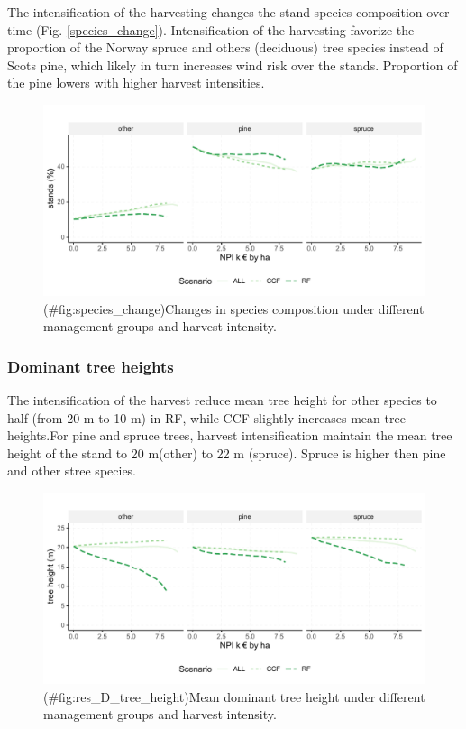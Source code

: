 \documentclass[]{elsarticle} %
\makeatletter
\def\maxwidth{\ifdim\Gin@nat@width>\linewidth\linewidth
\else\Gin@nat@width\fi}
\let\Oldincludegraphics\includegraphics
\renewcommand{\includegraphics}[1]{\Oldincludegraphics[width=\maxwidth]{#1}}
\makeatother
\begin{document}
The intensification of the harvesting changes the stand species composition over time (Fig. \ref{species_change}). Intensification of the harvesting favorize the proportion of the Norway spruce and others (deciduous) tree species instead of Scots pine, which likely in turn increases wind risk over the stands. Proportion of the pine lowers with higher harvest intensities.

\begin{figure}
\centering
\includegraphics{test_manus_files/figure-latex/species_change-1.pdf}
\caption{(\#fig:species\_change)Changes in species composition under different management groups and harvest intensity.}
\end{figure}

\hypertarget{dominant-tree-heights}{%
\subsubsection{Dominant tree heights}\label{dominant-tree-heights}}

The intensification of the harvest reduce mean tree height for other species to half (from 20 m to 10 m) in RF, while CCF slightly increases mean tree heights.For pine and spruce trees, harvest intensification maintain the mean tree height of the stand to 20 m(other) to 22 m (spruce). Spruce is higher then pine and other stree species.

\begin{figure}
\centering
\includegraphics{test_manus_files/figure-latex/res_D_tree_height-1.pdf}
\caption{(\#fig:res\_D\_tree\_height)Mean dominant tree height under different management groups and harvest intensity.}
\end{figure}
\end{document}
